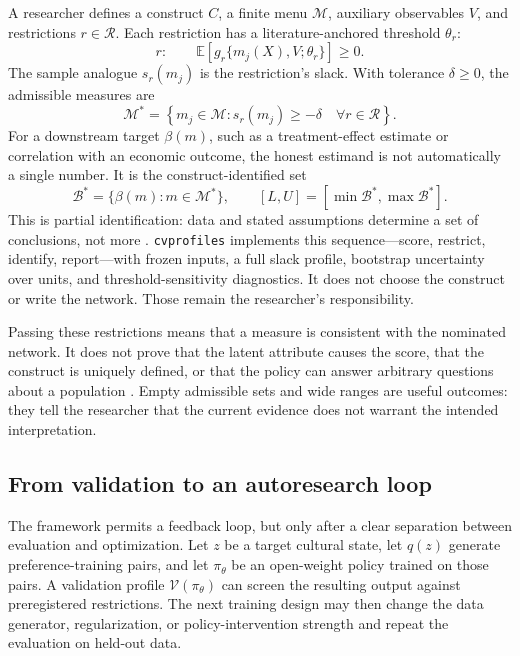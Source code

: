 \documentclass[10pt,letterpaper]{article}
\newcommand{\cvp}{\texttt{cvprofiles}}
\newcommand{\M}{\mathcal{M}}
\newcommand{\E}{\mathbb{E}}
\begin{document}
A researcher defines a construct $C$, a finite menu $\M$, auxiliary observables $V$, and restrictions $r\in\mathcal{R}$. Each restriction has a literature-anchored threshold $\theta_r$:
\begin{equation}
 r:\qquad \E\left[g_r\{m_j(X),V;\theta_r\}\right]\geq 0.
 \label{eq:restriction}
\end{equation}
The sample analogue $s_r(m_j)$ is the restriction's slack. With tolerance $\delta\geq0$, the admissible measures are
\begin{equation}
 \M^*=\left\{m_j\in\M:s_r(m_j)\geq-\delta\quad \forall r\in\mathcal{R}\right\}.
 \label{eq:admissible}
\end{equation}
For a downstream target $\beta(m)$, such as a treatment-effect estimate or correlation with an economic outcome, the honest estimand is not automatically a single number. It is the construct-identified set
\begin{equation}
 \mathcal{B}^*=\{\beta(m):m\in\M^*\},\qquad [L,U]=[\min\mathcal{B}^*,\max\mathcal{B}^*].
 \label{eq:range}
\end{equation}
This is partial identification: data and stated assumptions determine a set of conclusions, not more \cite{manski2003,schennach2021}. \cvp{} implements this sequence---score, restrict, identify, report---with frozen inputs, a full slack profile, bootstrap uncertainty over units, and threshold-sensitivity diagnostics. It does not choose the construct or write the network. Those remain the researcher's responsibility.

Passing these restrictions means that a measure is consistent with the nominated network. It does not prove that the latent attribute causes the score, that the construct is uniquely defined, or that the policy can answer arbitrary questions about a population \cite{borsboom2004}. Empty admissible sets and wide ranges are useful outcomes: they tell the researcher that the current evidence does not warrant the intended interpretation.

\subsection{From validation to an autoresearch loop}
The framework permits a feedback loop, but only after a clear separation between evaluation and optimization. Let $z$ be a target cultural state, let $q(z)$ generate preference-training pairs, and let $\pi_\theta$ be an open-weight policy trained on those pairs. A validation profile $\mathcal{V}(\pi_\theta)$ can screen the resulting output against preregistered restrictions. The next training design may then change the data generator, regularization, or policy-intervention strength and repeat the evaluation on held-out data.
\end{document}
